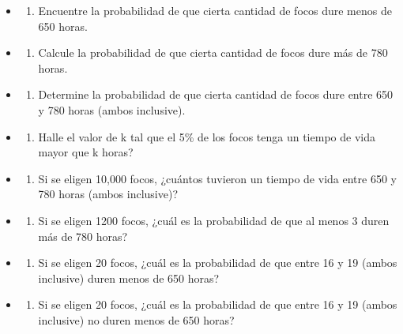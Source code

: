 \documentclass[
]{article}
\providecommand{\tightlist}{%
  \setlength{\itemsep}{0pt}\setlength{\parskip}{0pt}}
\begin{document}
\begin{itemize}
\tightlist
\item
  \begin{enumerate}
  \def\labelenumi{\alph{enumi})}
  \tightlist
  \item
    Encuentre la probabilidad de que cierta cantidad de focos dure menos
    de 650 horas.
  \end{enumerate}
\item
  \begin{enumerate}
  \def\labelenumi{\alph{enumi})}
  \setcounter{enumi}{1}
  \tightlist
  \item
    Calcule la probabilidad de que cierta cantidad de focos dure más de
    780 horas.
  \end{enumerate}
\item
  \begin{enumerate}
  \def\labelenumi{\alph{enumi})}
  \setcounter{enumi}{2}
  \tightlist
  \item
    Determine la probabilidad de que cierta cantidad de focos dure entre
    650 y 780 horas (ambos inclusive).
  \end{enumerate}
\item
  \begin{enumerate}
  \def\labelenumi{\alph{enumi})}
  \setcounter{enumi}{3}
  \tightlist
  \item
    Halle el valor de k tal que el 5\% de los focos tenga un tiempo de
    vida mayor que k horas?
  \end{enumerate}
\item
  \begin{enumerate}
  \def\labelenumi{\alph{enumi})}
  \setcounter{enumi}{4}
  \tightlist
  \item
    Si se eligen 10,000 focos, ¿cuántos tuvieron un tiempo de vida entre
    650 y 780 horas (ambos inclusive)?
  \end{enumerate}
\item
  \begin{enumerate}
  \def\labelenumi{\alph{enumi})}
  \setcounter{enumi}{5}
  \tightlist
  \item
    Si se eligen 1200 focos, ¿cuál es la probabilidad de que al menos 3
    duren más de 780 horas?
  \end{enumerate}
\item
  \begin{enumerate}
  \def\labelenumi{\alph{enumi})}
  \setcounter{enumi}{6}
  \tightlist
  \item
    Si se eligen 20 focos, ¿cuál es la probabilidad de que entre 16 y 19
    (ambos inclusive) duren menos de 650 horas?
  \end{enumerate}
\item
  \begin{enumerate}
  \def\labelenumi{\alph{enumi})}
  \setcounter{enumi}{7}
  \tightlist
  \item
    Si se eligen 20 focos, ¿cuál es la probabilidad de que entre 16 y 19
    (ambos inclusive) no duren menos de 650 horas?
  \end{enumerate}
\end{itemize}
\end{document}
